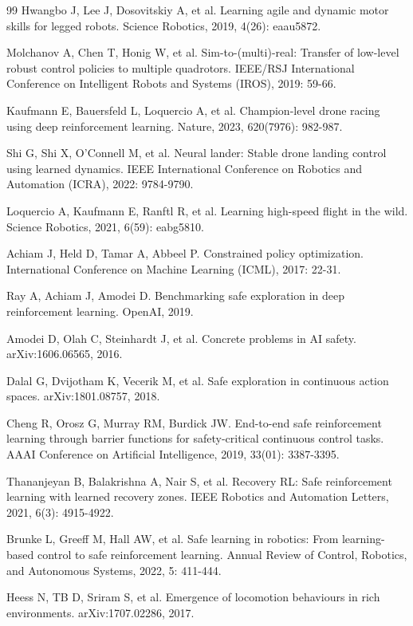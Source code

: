 \documentclass[12pt,a4paper]{ctexart}
\begin{document}
\begin{thebibliography}{99}
 Hwangbo J, Lee J, Dosovitskiy A, et al. Learning agile and dynamic motor skills for legged robots. Science Robotics, 2019, 4(26): eaau5872.

 Molchanov A, Chen T, Honig W, et al. Sim-to-(multi)-real: Transfer of low-level robust control policies to multiple quadrotors. IEEE/RSJ International Conference on Intelligent Robots and Systems (IROS), 2019: 59-66.

 Kaufmann E, Bauersfeld L, Loquercio A, et al. Champion-level drone racing using deep reinforcement learning. Nature, 2023, 620(7976): 982-987.

 Shi G, Shi X, O'Connell M, et al. Neural lander: Stable drone landing control using learned dynamics. IEEE International Conference on Robotics and Automation (ICRA), 2022: 9784-9790.

 Loquercio A, Kaufmann E, Ranftl R, et al. Learning high-speed flight in the wild. Science Robotics, 2021, 6(59): eabg5810.

 Achiam J, Held D, Tamar A, Abbeel P. Constrained policy optimization. International Conference on Machine Learning (ICML), 2017: 22-31.

 Ray A, Achiam J, Amodei D. Benchmarking safe exploration in deep reinforcement learning. OpenAI, 2019.

 Amodei D, Olah C, Steinhardt J, et al. Concrete problems in AI safety. arXiv:1606.06565, 2016.

 Dalal G, Dvijotham K, Vecerik M, et al. Safe exploration in continuous action spaces. arXiv:1801.08757, 2018.

 Cheng R, Orosz G, Murray RM, Burdick JW. End-to-end safe reinforcement learning through barrier functions for safety-critical continuous control tasks. AAAI Conference on Artificial Intelligence, 2019, 33(01): 3387-3395.

 Thananjeyan B, Balakrishna A, Nair S, et al. Recovery RL: Safe reinforcement learning with learned recovery zones. IEEE Robotics and Automation Letters, 2021, 6(3): 4915-4922.

 Brunke L, Greeff M, Hall AW, et al. Safe learning in robotics: From learning-based control to safe reinforcement learning. Annual Review of Control, Robotics, and Autonomous Systems, 2022, 5: 411-444.

 Heess N, TB D, Sriram S, et al. Emergence of locomotion behaviours in rich environments. arXiv:1707.02286, 2017.


\end{thebibliography}
\end{document}
